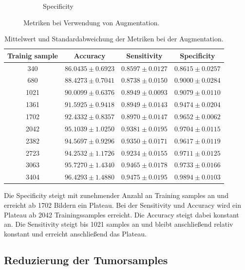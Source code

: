 \begin{figure}[H]
\begin{subfigure}[b]{0.48\textwidth}
    \caption{Specificity}
    \label{fig:augmentation_specificity}
  \end{subfigure}
  \caption{Metriken bei Verwendung von Augmentation.}
  \label{fig:augmentation}
\end{figure}

\begin{table}[H]
    \centering
        \begin{tabular}{cccc}
            \toprule
            Trainig sample & Accuracy & Sensitivity & Specificity\\
            \midrule
            340  & $86.0435 \pm 0.6923$ & $0.8597 \pm 0.0127$ & $0.8615 \pm 0.0257$\\
            680  & $88.4273 \pm 0.7041$ & $0.8738 \pm 0.0150$ & $0.9000 \pm 0.0284$\\
            1021 & $90.0099 \pm 0.6376$ & $0.8949 \pm 0.0093$ & $0.9079 \pm 0.0110$\\
            1361 & $91.5925 \pm 0.9418$ & $0.8949 \pm 0.0143$ & $0.9474 \pm 0.0204$\\
            1702 & $92.4332 \pm 0.8357$ & $0.8970 \pm 0.0147$ & $0.9652 \pm 0.0062$\\
            2042 & $95.1039 \pm 1.0250$ & $0.9381 \pm 0.0195$ & $0.9704 \pm 0.0115$\\
            2382 & $94.5697 \pm 0.9296$ & $0.9350 \pm 0.0171$ & $0.9617 \pm 0.0119$\\
            2723 & $94.2532 \pm 1.1726$ & $0.9234 \pm 0.0155$ & $0.9711 \pm 0.0125$\\
            3063 & $95.7270 \pm 1.4340$ & $0.9465 \pm 0.0178$ & $0.9733 \pm 0.0166$\\
            3404 & $96.4293 \pm 1.4880$ & $0.9475 \pm 0.0195$ & $0.9894 \pm 0.0103$\\
            \bottomrule
        \end{tabular}
  \caption{Mittelwert und Standardabweichung der Metriken bei der Augmentation.}
  \label{tab:}
\end{table}
Die Specificity steigt mit zunehmender Anzahl an Training samples an und erreicht ab 1702 Bildern ein Plateau.
Bei der Sensitivity und Accuracy wird ein Plateau ab 2042 Trainingssamples erreicht.
Die Accuracy steigt dabei konstant an. 
Die Sensitivity steigt bis 1021 samples an und bleibt anschließend relativ konstant und erreicht anschließend das Plateau.

\subsection{Reduzierung der Tumorsamples}

